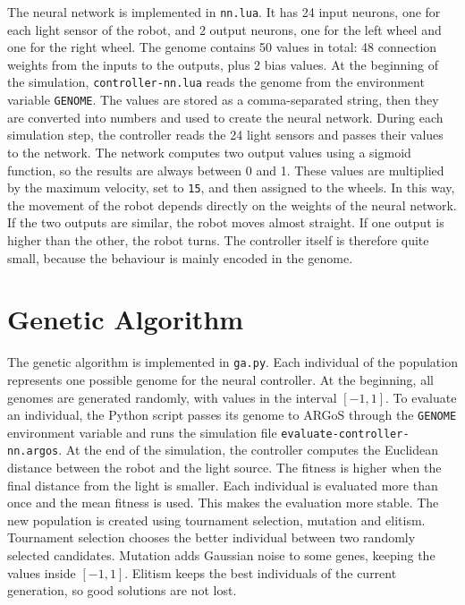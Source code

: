 \documentclass[a4paper,12pt]{report}
\begin{document}
The neural network is implemented in \texttt{nn.lua}. It has 24 input neurons, one for each light sensor of the robot, and 2 output neurons, one for the left wheel and one for the right wheel. The genome contains 50 values in total: 48 connection weights from the inputs to the outputs, plus 2 bias values.
\newline
At the beginning of the simulation, \texttt{controller-nn.lua} reads the genome from the environment variable \texttt{GENOME}. The values are stored as a comma-separated string, then they are converted into numbers and used to create the neural network.
\newline
During each simulation step, the controller reads the 24 light sensors and passes their values to the network. The network computes two output values using a sigmoid function, so the results are always between 0 and 1. These values are multiplied by the maximum velocity, set to \texttt{15}, and then assigned to the wheels.
\newline
In this way, the movement of the robot depends directly on the weights of the neural network. If the two outputs are similar, the robot moves almost straight. If one output is higher than the other, the robot turns. The controller itself is therefore quite small, because the behaviour is mainly encoded in the genome.

\section{Genetic Algorithm}

The genetic algorithm is implemented in \texttt{ga.py}. Each individual of the population represents one possible genome for the neural controller. At the beginning, all genomes are generated randomly, with values in the interval $[-1, 1]$.
\newline
To evaluate an individual, the Python script passes its genome to ARGoS through the \texttt{GENOME} environment variable and runs the simulation file \texttt{evaluate-controller-nn.argos}. At the end of the simulation, the controller computes the Euclidean distance between the robot and the light source. The fitness is higher when the final distance from the light is smaller.
\newline
Each individual is evaluated more than once and the mean fitness is used. This makes the evaluation more stable. The new population is created using tournament selection, mutation and elitism. Tournament selection chooses the better individual between two randomly selected candidates. Mutation adds Gaussian noise to some genes, keeping the values inside $[-1, 1]$. Elitism keeps the best individuals of the current generation, so good solutions are not lost.
\end{document}
